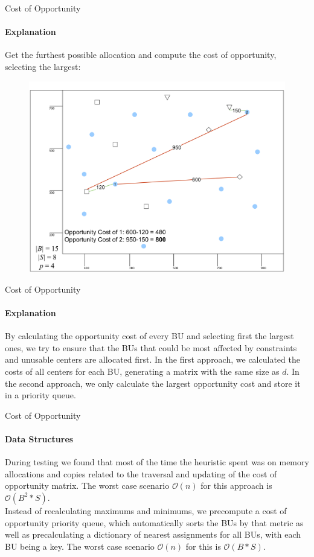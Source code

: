 \documentclass{beamer}
\begin{document}
\begin{frame}{Cost of Opportunity}
    \framesubtitle{Explanation}
    Get the furthest possible allocation and compute the cost of opportunity, selecting the largest:
    \begin{figure}
        \centering
        \includegraphics[scale=0.076]{images/opp_2.pdf}
    \end{figure}
\end{frame}
\begin{frame}{Cost of Opportunity}
    \framesubtitle{Explanation}
    By calculating the opportunity cost of every BU and selecting first the largest ones, we try to ensure that the BUs that could be most affected by constraints and unusable centers are allocated first. 
    In the first approach, we calculated the costs of all centers for each BU, generating a matrix with the same size as $d$. In the second approach, we only calculate the largest opportunity cost and store it in a priority queue. 
\end{frame}

\begin{frame}{Cost of Opportunity}
    \framesubtitle{Data Structures}
    During testing we found that most of the time the heuristic spent was on memory allocations and copies related to the traversal and updating of the cost of opportunity matrix. The worst case scenario $\mathcal{O}(n)$ for this approach is $\mathcal{O}(B^2*S)$.
    \\
    Instead of recalculating maximums and minimums, we precompute a cost of opportunity priority queue, which automatically sorts the BUs by that metric as well as precalculating a dictionary of nearest assignments for all BUs, with each BU being a key. The worst case scenario $\mathcal{O}(n)$ for this is $\mathcal{O}(B*S)$. 
\end{frame}
\end{document}
